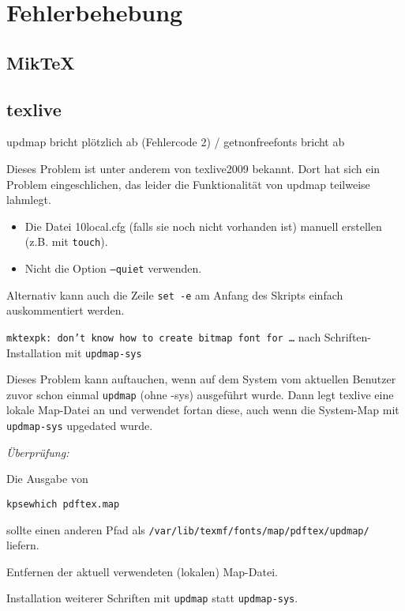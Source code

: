 \section{Fehlerbehebung}

\subsection{MikTeX}

\subsection{texlive}

\begin{knownissue}{%
  updmap bricht plötzlich ab (Fehlercode 2) / getnonfreefonts bricht ab
}

Dieses Problem ist unter anderem von texlive2009 bekannt.
Dort hat sich ein Problem eingeschlichen, das leider die Funktionalität von
updmap teilweise lahmlegt.

\begin{itemize}
  \item Die Datei 10local.cfg (falls sie noch nicht vorhanden ist) manuell
    erstellen (z.B. mit \texttt{touch}).
  \item Nicht die Option \texttt{--quiet} verwenden.
\end{itemize}

Alternativ kann auch die Zeile \lstinline{set -e} am Anfang des Skripts einfach auskommentiert werden.
\end{knownissue}


\begin{knownissue}{
  \texttt{mktexpk: don't know how to create bitmap font for \ldots}\newline
  nach Schriften-Installation mit \lstinline{updmap-sys}}

Dieses Problem kann auftauchen, wenn auf dem System vom aktuellen Benutzer
zuvor schon einmal \lstinline{updmap} (ohne -sys) ausgeführt wurde.
Dann legt texlive eine lokale Map-Datei an und verwendet fortan diese,
auch wenn die System-Map mit \lstinline{updmap-sys} upgedated wurde.

\noindent\textit{Überprüfung:}

Die Ausgabe von
\begin{lstlisting}
kpsewhich pdftex.map
\end{lstlisting}
sollte einen anderen Pfad als
\lstinline{/var/lib/texmf/fonts/map/pdftex/updmap/} liefern.


Entfernen der aktuell verwendeten (lokalen) Map-Datei.


Installation weiterer Schriften mit \lstinline{updmap} statt
\lstinline{updmap-sys}.

\end{knownissue}




